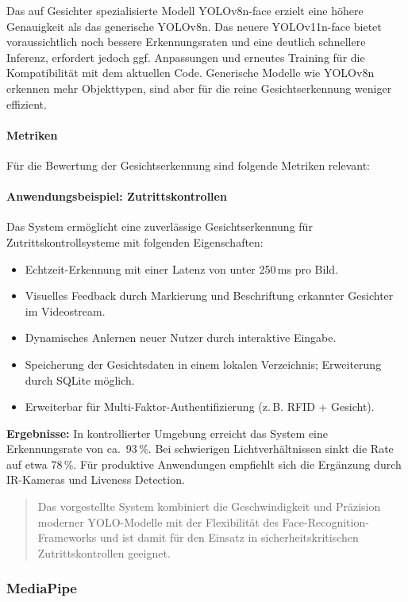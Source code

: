 Das auf Gesichter spezialisierte Modell YOLOv8n-face erzielt eine höhere Genauigkeit als das generische YOLOv8n. Das neuere YOLOv11n-face bietet voraussichtlich noch bessere Erkennungsraten und eine deutlich schnellere Inferenz, erfordert jedoch ggf. Anpassungen und erneutes Training für die Kompatibilität mit dem aktuellen Code. Generische Modelle wie YOLOv8n erkennen mehr Objekttypen, sind aber für die reine Gesichtserkennung weniger effizient.

\paragraph{Metriken}
Für die Bewertung der Gesichtserkennung sind folgende Metriken relevant:

\paragraph{Anwendungsbeispiel: Zutrittskontrollen}
Das System ermöglicht eine zuverlässige Gesichtserkennung für Zutrittskontrollsysteme mit folgenden Eigenschaften:
\begin{itemize}
    \item Echtzeit-Erkennung mit einer Latenz von unter 250\,ms pro Bild.
    \item Visuelles Feedback durch Markierung und Beschriftung erkannter Gesichter im Videostream.
    \item Dynamisches Anlernen neuer Nutzer durch interaktive Eingabe.
    \item Speicherung der Gesichtsdaten in einem lokalen Verzeichnis; Erweiterung durch SQLite möglich.
    \item Erweiterbar für Multi-Faktor-Authentifizierung (z.\,B. RFID + Gesicht).
\end{itemize}

\textbf{Ergebnisse:} In kontrollierter Umgebung erreicht das System eine Erkennungsrate von ca.~93\,\%. Bei schwierigen Lichtverhältnissen sinkt die Rate auf etwa 78\,\%. Für produktive Anwendungen empfiehlt sich die Ergänzung durch IR-Kameras und Liveness Detection.

\begin{quote}
Das vorgestellte System kombiniert die Geschwindigkeit und Präzision moderner YOLO-Modelle mit der Flexibilität des Face-Recognition-Frameworks und ist damit für den Einsatz in sicherheitskritischen Zutrittskontrollen geeignet.
\end{quote}

\subsubsection{MediaPipe}
